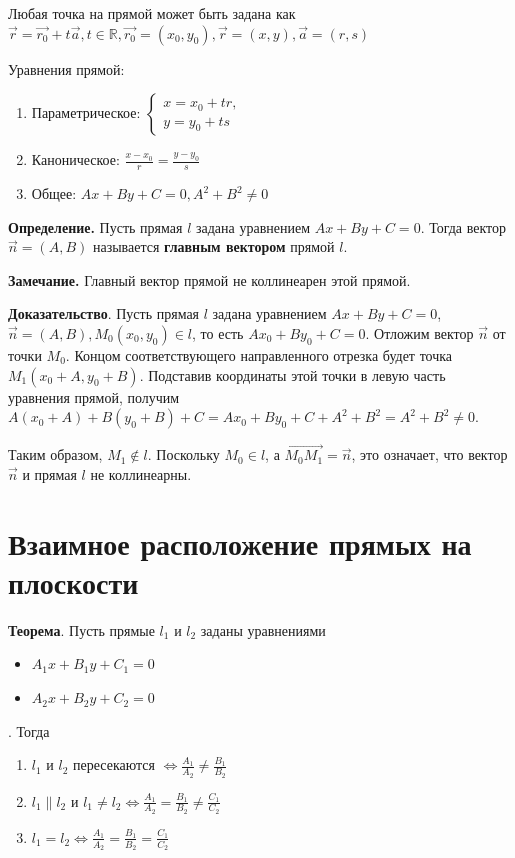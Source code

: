 \documentclass[a4paper]{article}
\begin{document}
{\begin{small}
Любая точка на прямой может быть задана как $\vec{r} = \vec{r_0} + t\vec{a}, t \in \mathbb{R}, \vec{r_0} = (x_0, y_0), \vec{r} = (x,y), \vec{a} = (r, s)$ 

Уравнения прямой:
\begin{enumerate}


\item Параметрическое: $
 \begin{cases}
   x = x_0 + tr,
   \\
   y = y_0 + ts
 \end{cases}$

\item Каноническое: $\displaystyle \frac{x-x_0}{r} = \frac{y-y_0}{s}$
\item Общее: $Ax + By + C = 0, A^2 + B^2 \neq 0$
\end{enumerate}

\textbf{Определение.} Пусть прямая $l$ задана уравнением $Ax + By + C = 0$. Тогда вектор $\vec{n} = (A, B)$ называется \textbf{главным вектором} прямой $l$.

\textbf{Замечание.} Главный вектор прямой не коллинеарен этой прямой.

\textbf{Доказательство}. Пусть прямая $l$ задана уравнением $Ax + By + C = 0$, $\vec{n} = (A, B), M_0 (x_0, y_0) \in l$, то есть $Ax_0 + By_0 + C = 0$. Отложим вектор $\vec{n}$ от точки $M_0$. Концом соответствующего направленного отрезка будет точка $M_1(x_0 + A, y_0 + B)$. Подставив координаты этой точки в левую часть уравнения прямой, получим $A (x_0 + A) + B(y_0 + B) + C = Ax_0 + By_0 + C + A^2 + B^2 = A^2 + B^2 \neq 0$.

Таким образом, $M_1 \notin l$. Поскольку $M_0 \in l$, а $\overrightarrow{M_0 M_1} = \vec{n}$, это означает, что вектор $\vec{n}$ и прямая $l$ не коллинеарны.

\section*{Взаимное расположение прямых на плоскости}

\textbf{Теорема}. Пусть прямые $l_1$ и $l_2$ заданы уравнениями \begin{itemize}
\item $A_1x+B_1y+C_1 = 0$
\item $A_2x+B_2y+C_2 = 0$
\end{itemize}. Тогда \begin{enumerate}
\item $l_1$ и $l_2$ пересекаются $\displaystyle \Leftrightarrow \frac{A_1}{A_2} \neq \frac{B_1}{B_2}$
\item $\displaystyle l_1 \parallel l_2$ и $\displaystyle l_1 \neq l_2 \Leftrightarrow \frac{A_1}{A_2} = \frac{B_1}{B_2} \neq \frac{C_1}{C_2}$
\item $\displaystyle l_1 = l_2 \Leftrightarrow \frac{A_1}{A_2} = \frac{B_1}{B_2} = \frac{C_1}{C_2}$
\end{enumerate}


\end{small}}
\end{document}

